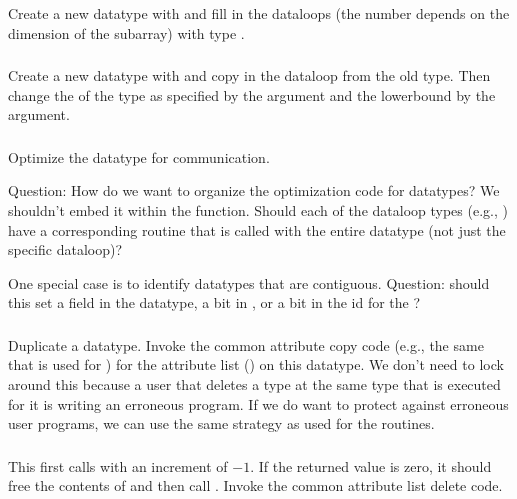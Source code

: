 \documentclass{article}
\begin{document}
\subsubsection{}
Create a new datatype with  and fill in the
dataloops (the number depends on the dimension of the subarray) 
with type .

\subsubsection{}
Create a new datatype with  and copy in the
dataloop from the old type.  Then change the
 of the type as specified by the
 argument and the lowerbound by the  argument. 

\subsubsection{}
Optimize the datatype for communication.  

Question:  How do we want to organize the optimization code for datatypes?  We
shouldn't embed it within the  function.  Should each of
the dataloop types (e.g., ) have a corresponding routine
that is called with the entire datatype (not just the specific dataloop)?

One special case is to identify datatypes that are contiguous.  
Question: should this set a field in the datatype, a bit in
, or a bit in the id for the
? 

\subsubsection{}
Duplicate a datatype.  Invoke the common attribute copy code (e.g., the same
that is used for ) for the attribute
list () on this datatype.
We don't need to lock around this because a user that deletes a type
at the same type that  is executed for it is
writing an erroneous program.  If we do want to protect against
erroneous user programs, we can use the same strategy as used for the
 routines.

\subsubsection{}
This first calls  with an increment of $-1$.  If
the returned value is zero, it should free the contents of  and
then call .  Invoke the common attribute list
delete code.
\end{document}
